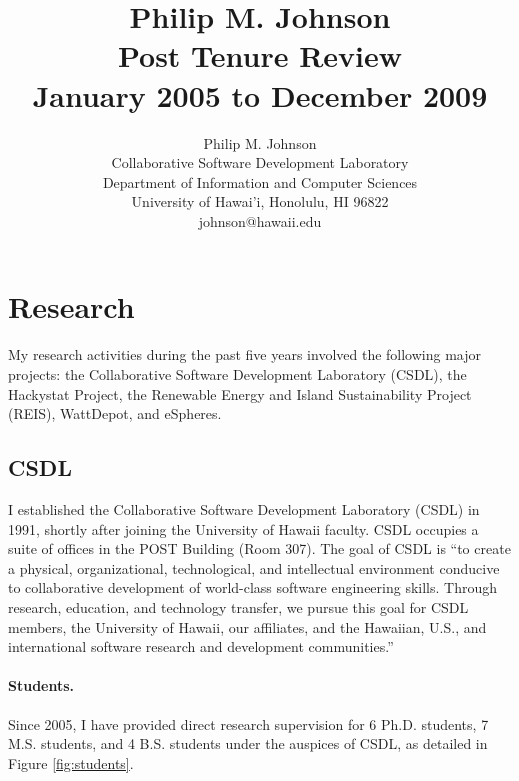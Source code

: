 \documentclass[11pt]{article}
\begin{document}
\title{{\bf Philip M. Johnson \\ 
       Post Tenure Review \\ 
       January 2005 to December 2009}}

\author{Philip M. Johnson \\
      Collaborative Software Development Laboratory \\
      Department of Information and Computer Sciences \\
      University of Hawai'i,  Honolulu, HI 96822 \\
      johnson@hawaii.edu 
}

\maketitle

\section{Research}

My research activities during the past five years involved the following major projects: the Collaborative Software Development Laboratory (CSDL), the Hackystat Project, the Renewable Energy and Island Sustainability Project (REIS), WattDepot, and eSpheres.

\subsection{CSDL}

I established the Collaborative Software Development Laboratory (CSDL) in 1991, shortly after joining the University of Hawaii faculty.  CSDL occupies a suite of offices in the POST Building (Room 307). The goal of CSDL is ``to create a physical, organizational, technological, and intellectual environment conducive to collaborative development of world-class software engineering skills. Through research, education, and technology transfer, we pursue this goal for CSDL members, the University of Hawaii, our affiliates, and the Hawaiian, U.S., and international software research and development communities.''

\paragraph{Students.} Since 2005, I have provided direct research supervision for 6 Ph.D. students, 7 M.S. students, and 4 B.S. students under the auspices of CSDL, as detailed in Figure \ref{fig:students}.
\end{document}
